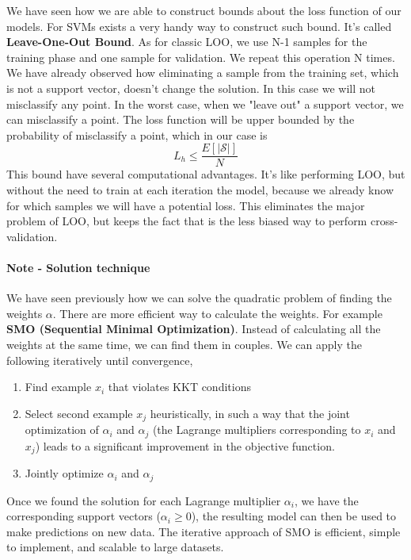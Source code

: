 \documentclass[../main.tex]{subfiles}
\begin{document}
We have seen how we are able to construct bounds about the loss function of our models. For SVMs exists a very handy way to construct such bound. It's called \textbf{Leave-One-Out Bound}.
As for classic LOO, we use N-1 samples for the training phase and one sample for validation. We repeat this operation N times. We have already observed how eliminating a sample from the training set, which is not a support vector, doesn't change the solution. In this case we will not misclassify any point. In the worst case, when we "leave out" a support vector, we can misclassify a point. The loss function will be upper bounded by the probability of misclassify a point, which in our case is \footnotemark {}
\begin{equation}
    L_h \leq \frac{E[|\mathcal{S}|]}{N}
\end{equation}
This bound have several computational advantages. It's like performing LOO, but without the need to train at each iteration the model, because we already know for which samples we will have a potential loss. This eliminates the major problem of LOO, but keeps the fact that is the less biased way to perform cross-validation.

\paragraph{Note - Solution technique} We have seen previously how we can solve the quadratic problem of finding the weights $\alpha$. There are more efficient way to calculate the weights. For example \textbf{SMO (Sequential Minimal Optimization)}.
Instead of calculating all the weights at the same time, we can find them in couples\footnotemark. We can apply the following iteratively until convergence,
\begin{enumerate}
    \item Find example $x_i$ that violates KKT conditions
    \item Select second example $x_j$ heuristically, in such a way that the joint optimization of \( \alpha_i \) and \( \alpha_j \) (the Lagrange multipliers corresponding to \( x_i \) and \( x_j \)) leads to a significant improvement in the objective function.
    \item Jointly optimize $\alpha_i$ and $\alpha_j$
\end{enumerate}

Once we found the solution for each Lagrange multiplier $\alpha_i$, we have the corresponding support vectors ($\alpha_i \ge 0$), the resulting model can then be used to make predictions on new data.
The iterative approach of SMO is efficient, simple to implement, and scalable to large datasets.
\end{document}
